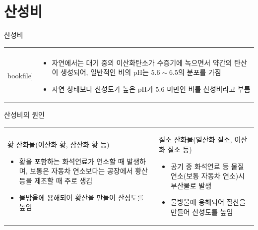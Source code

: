\section{산성비}

\begin{frame}[t]{산성비}
	\begin{tabular}{ll}
		\begin{minipage}[t]{0.6\textwidth}\scriptsize
			\begin{figure}[t]
				\texttt{[image: \\bookfile]}
			\end{figure}
		\end{minipage}	
		&
		\begin{minipage}[t]{0.35\textwidth} \scriptsize	
			\begin{itemize}
				\item 자연에서는 대기 중의 이산화탄소가 수증기에 녹으면서 약간의 탄산이 생성되어, 일반적인 비의 pH는 $5.6 \sim 6.5$의 분포를 가짐
				\item 자연 상태보다 산성도가 높은 pH가 5.6 미만인 비를 산성비라고 부름			
			\end{itemize}

		\end{minipage}
	\end{tabular}
\end{frame}



\begin{frame}[t]{산성비의 원인}
	\begin{tabular}{ll}
		\begin{minipage}[t]{0.475\textwidth}\scriptsize
			황 산화물(이산화 황, 삼산화 황 등)
			\begin{itemize}
				\item 황을 포함하는 화석연료가 연소할 때 발생하며, 보통은 자동차 연소보다는 공장에서 황산 등을 제조할 때 주로 생김
				\item 물방울에 용해되어 황산을 만들어 산성도를 높임

			\end{itemize}

		\end{minipage}	
		&
		\begin{minipage}[t]{0.475\textwidth} \scriptsize	
			질소 산화물(일산화 질소, 이산화 질소 등)			
			\begin{itemize}
				\item 공기 중 화석연료 등 물질 연소(보통 자동차 연소)시 부산물로 발생
				\item 물방울에 용해되어 질산을 만들어 산성도를 높임
			
			\end{itemize}

		\end{minipage}
	\end{tabular}
\end{frame}



